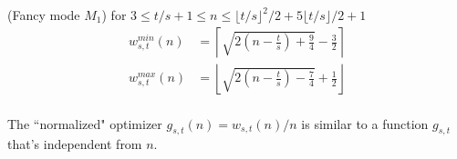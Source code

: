 \documentclass[]{article}
\begin{document}
\hspace{1cm}
\begin{lemma} 
	(Fancy mode $M_1$) for $3\leq t/s +1 \leq n \leq \lfloor t/s\rfloor^2/2+5\lfloor t/s\rfloor / 2 +1$
	\begin{align*}
		w^{min}_{s,t}(n) &= \left\lceil \sqrt{2\left(n-\frac{t}{s}\right)+\frac{9}{4}}-\frac{3}{2} \right\rceil\\
		w^{max}_{s,t}(n) &= \left\lfloor \sqrt{2\left(n-\frac{t}{s}\right)-\frac{7}{4}}+\frac{1}{2} \right\rfloor\\
	\end{align*}
\end{lemma}

\hspace{1cm}
\begin{lemma} 
	The ``normalized" optimizer $g_{s,t}(n) = w_{s,t}(n)/n$ is similar to a function $g_{s,t}$ that's independent from $n$.
\end{lemma}
\end{document}
